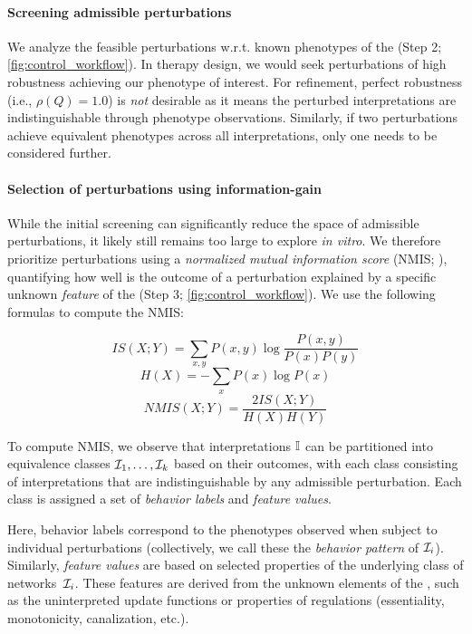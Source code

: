 \paragraph{Screening admissible perturbations}
We analyze the feasible perturbations w.r.t. known phenotypes of the \PBN{} (Step 2; \autoref{fig:control_workflow}). In therapy design, we would seek perturbations of high robustness achieving our phenotype of interest. For refinement, perfect robustness (i.e., $\rho(Q) = 1.0$) is \emph{not} desirable as it means the perturbed interpretations are indistinguishable through phenotype observations. Similarly, if two perturbations achieve equivalent phenotypes across all interpretations, only one needs to be considered further.

\paragraph{Selection of perturbations using information-gain}

While the initial screening can significantly reduce the space of admissible perturbations, it likely still remains too large to explore \emph{in vitro}. We therefore prioritize perturbations using a \emph{normalized mutual information score} (NMIS; \cite{Kent83}), quantifying how well is the outcome of a perturbation explained by a specific unknown \emph{feature} of the \PBN{} (Step 3;  \autoref{fig:control_workflow}). We use the following formulas to compute the NMIS:

$$
IS(X; Y) = \sum_{x, y} P(x, y) \log \frac{P(x, y)}{P(x) P(y)}
$$
$$
H(X) = -\sum_{x} P(x) \log P(x)
$$
$$ 
NMIS(X; Y) = \frac{2 IS(X; Y)}{H(X) H(Y)} 
$$

To compute NMIS, we observe that interpretations $\mathbb{I}$ can be partitioned into equivalence classes $\mathcal{I}_1, \ldots, \mathcal{I}_k$ based on their outcomes, with each class consisting of interpretations that are indistinguishable by any admissible perturbation. Each class is assigned a set of \emph{behavior labels} and \emph{feature values}. 

Here, behavior labels correspond to the phenotypes observed when subject to individual perturbations (collectively, we call these the \emph{behavior pattern} of $\mathcal{I}_i$). Similarly, \emph{feature values} are based on selected properties of the underlying class of networks~$\mathcal{I}_i$. These features are derived from the unknown elements of the \PBN{}, such as the uninterpreted update functions or properties of regulations (essentiality, monotonicity, canalization, etc.).

